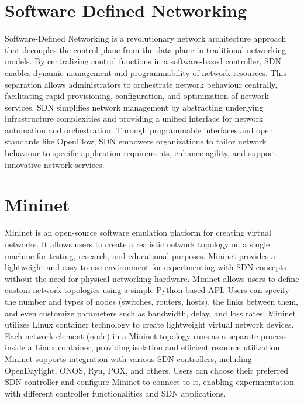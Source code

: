 \section{Software Defined Networking}
\vspace{-18pt}
Software-Defined Networking is a revolutionary network architecture approach that decouples the control plane from the data plane in traditional networking models. By centralizing control functions in a software-based controller, SDN enables dynamic management and programmability of network resources. This separation allows administrators to orchestrate network behaviour centrally, facilitating rapid provisioning, configuration, and optimization of network services. SDN simplifies network management by abstracting underlying infrastructure complexities and providing a unified interface for network automation and orchestration. Through programmable interfaces and open standards like OpenFlow, SDN empowers organizations to tailor network behaviour to specific application requirements, enhance agility, and support innovative network services.
\section{Mininet}
\vspace{-18pt}
Mininet is an open-source software emulation platform for creating virtual networks. It allows users to create a realistic network topology on a single machine for testing, research, and educational purposes. Mininet provides a lightweight and easy-to-use environment for experimenting with SDN concepts without the need for physical networking hardware. Mininet allows users to define custom network topologies using a simple Python-based API. Users can specify the number and types of nodes (switches, routers, hosts), the links between them, and even customize parameters such as bandwidth, delay, and loss rates. Mininet utilizes Linux container technology to create lightweight virtual network devices. Each network element (node) in a Mininet topology runs as a separate process inside a Linux container, providing isolation and efficient resource utilization. Mininet supports integration with various SDN controllers, including OpenDaylight, ONOS, Ryu, POX, and others. Users can choose their preferred SDN controller and configure Mininet to connect to it, enabling experimentation with different controller functionalities and SDN applications.
